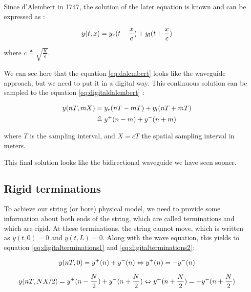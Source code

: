 Since d'Alembert in 1747, the solution of the later equation is known and can be expressed as :

\begin{equation*}
    \centering
    y(t,x) = y_{r}(t-\frac{x}{c}) + y_{l}(t+\frac{x}{c})
    \label{eq:dalembert}
\end{equation*}

where $c \triangleq \sqrt{\frac{K}{\epsilon}}$.

We can see here that the equation \ref{eq:dalembert} looks like the waveguide approach, but we need to put it in a digital way. This continuous solution can be sampled to the equation \ref{eq:digitaldalembert} :

\begin{equation}
    \centering
    \begin{align}
        y(nT,mX) &= y_{r}(nT - mT) + y_{l}(nT + mT)\\
                 &\triangleq y^{+}(n-m) + y^{-}(n+m)
        \label{eq:digitaldalembert}
    \end{align}
\end{equation}

where $T$ is the sampling interval, and $X = cT$ the spatial sampling interval in meters. 

This final solution looks like the bidirectional waveguide we have seen sooner.

\subsection{Rigid terminations}

To achieve our string (or bore) physical model, we need to provide some information about both ends of the string, which are called terminations and which are rigid.
At these terminations, the string cannot move, which is written as $y(t,0) = 0$ and $y(t,L) = 0$. Along with the wave equation, this yields to equation \ref{eq:digitalterminations1} and \ref{eq:digitalterminations2}:

\begin{equation}
\centering
    y(nT,0) = y^{+}(n) + y^{-}(n) \Leftrightarrow y^{+}(n) = - y^{-}(n)
    \label{eq:digitalterminations1}
\end{equation}

\begin{equation}
\centering
    y(nT,NX/2) = y^{+}(n-\frac{N}{2}) + y^{-}(n+\frac{N}{2}) \Leftrightarrow y^{+}(n+\frac{N}{2}) = - y^{-}(n+\frac{N}{2})
    \label{eq:digitalterminations2}
\end{equation}

